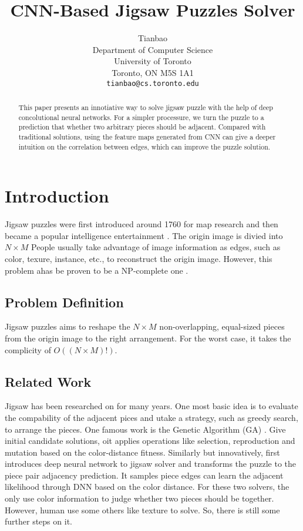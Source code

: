 \documentclass{article}
\title{CNN-Based Jigsaw Puzzles Solver}
\author{Tianbao\\
  Department of Computer Science\\
  University of Toronto\\
  Toronto, ON M5S 1A1 \\
  \texttt{tianbao@cs.toronto.edu} \\
}
\begin{document}

\maketitle

\begin{abstract}
  This paper presents an innotiative way to solve jigsaw puzzle with the help of deep concolutional neural networks. For a simpler processure, we turn the puzzle to a prediction that whether two arbitrary pieces should be adjacent. Compared with traditional solutions, using the feature maps generated from CNN can give a deeper intuition on the correlation between edges, which can improve the puzzle solution.
\end{abstract}

\section{Introduction}

Jigsaw puzzles were first introduced around 1760 for map research and then became a popular intelligence entertainment \cite{freeman1964apictorial}. The origin image is divied into $N\times M$
People usually take advantage of image information as edges, such as color, texure, instance, etc., to reconstruct the origin image. However, this problem ahas be proven to be a NP-complete one \cite{altman1989solving,demaine2007jigsaw}.

\subsection{Problem Definition}

Jigsaw puzzles aims to reshape the $N\times M$ non-overlapping, equal-sized pieces from the origin image to the right arrangement. For the worst case, it takes the complicity of $O((N\times M)!)$.

\subsection{Related Work}

Jigsaw has been researched on for many years. One most basic idea is to evaluate the compability of the adjacent pices and utake a strategy, such as greedy search, to arrange the pieces. One famous work is the Genetic Algorithm (GA) \cite{sholomon2013genetic}. Give initial candidate solutions, oit applies operations like selection, reproduction and mutation based on the color-distance fitness. Similarly but innovatively, \cite{sholomon2016dnn} first introduces deep neural network to jigsaw solver and transforms the puzzle to the piece pair adjacency prediction. It samples piece edges can learn the adjacent likelihood through DNN based on the color distance. For these two solvers, the only use color information to judge whether two pieces should be together. However, human use some others like texture to solve. So, there is still some further steps on it.
\end{document}
